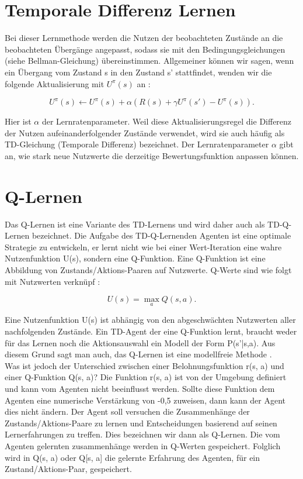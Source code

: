 \section{Temporale Differenz Lernen}
\label{sec:Temporale Differenz Lernen}
Bei dieser Lernmethode werden die Nutzen der beobachteten Zustände an die beobachteten Übergänge angepasst, sodass sie mit den Bedingungsgleichungen (siehe Bellman-Gleichung) übereinstimmen. Allgemeiner können wir sagen, wenn ein Übergang vom Zustand s in den Zustand s' stattfindet, wenden wir die folgende Aktualisierung mit $U^\pi(s)$ an \cite[966\psq]{Russell}:

\begin{equation}
\label{eq:Aktualisierung temporale Differenz}
U^\pi(s) \leftarrow U^\pi(s) + \alpha(R(s) + \gamma U^\pi(s') - U^\pi(s)).
\end{equation}

Hier ist $\alpha$ der Lernratenparameter. Weil diese Aktualisierungsregel die Differenz der Nutzen aufeinanderfolgender Zustände verwendet, wird sie auch häufig als TD-Gleichung (Temporale Differenz) bezeichnet. Der Lernratenparameter $\alpha$ gibt an, wie stark neue Nutzwerte die derzeitige Bewertungsfunktion anpassen können. 

\section{Q-Lernen}
Das Q-Lernen ist eine Variante des TD-Lernens und wird daher auch als TD-Q-Lernen bezeichnet. Die Aufgabe des TD-Q-Lernenden Agenten ist eine optimale Strategie zu entwickeln, er lernt nicht wie bei einer Wert-Iteration eine wahre Nutzenfunktion U(s), sondern eine Q-Funktion. Eine Q-Funktion ist eine Abbildung von Zustands/Aktions-Paaren auf Nutzwerte. Q-Werte sind wie folgt mit Nutzwerten verknüpf \cite[973]{Russell}:

\begin{equation}
U(s) = \max_a Q(s,a).
\end{equation}

Eine Nutzenfunktion U(s) ist abhängig von den abgeschwächten Nutzwerten aller nachfolgenden Zustände. Ein TD-Agent der eine Q-Funktion lernt, braucht weder für das Lernen noch die Aktionsauswahl ein Modell der Form P(s'|s,a). Aus diesem Grund sagt man auch, das Q-Lernen ist eine modellfreie Methode \cite[974]{Russell}. \\

Was ist jedoch der Unterschied zwischen einer Belohnungsfunktion r(s, a) und einer Q-Funktion Q(s, a)? Die Funktion r(s, a) ist von der Umgebung definiert und kann vom Agenten nicht beeinflusst werden. Sollte diese Funktion dem Agenten eine numerische Verstärkung von -0,5 zuweisen, dann kann der Agent dies nicht ändern. Der Agent soll versuchen die Zusammenhänge der Zustands/Aktions-Paare zu lernen und Entscheidungen basierend auf seinen Lernerfahrungen zu treffen. Dies bezeichnen wir dann als Q-Lernen. Die vom Agenten gelernten zusammenhänge werden in Q-Werten gespeichert. Folglich wird in Q(s, a) oder Q[s, a] die gelernte Erfahrung des Agenten, für ein Zustand/Aktions-Paar, gespeichert. \\
